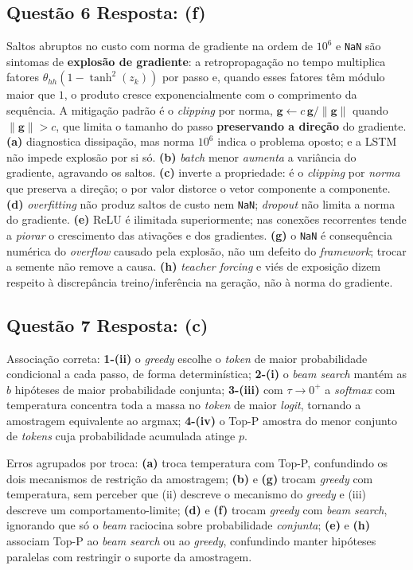 \documentclass[11pt,a4paper]{article}
\begin{document}
\subsection*{Questão 6 \textemdash{} Resposta: (f)}
Saltos abruptos no custo com norma de gradiente na ordem de $10^{6}$ e \texttt{NaN} são sintomas de \textbf{explosão de gradiente}: a retropropagação no tempo multiplica fatores $\theta_{hh}(1-\tanh^2(z_k))$ por passo e, quando esses fatores têm módulo maior que $1$, o produto cresce exponencialmente com o comprimento da sequência. A mitigação padrão é o \textit{clipping} por norma, $\mathbf{g} \leftarrow c\,\mathbf{g}/\|\mathbf{g}\|$ quando $\|\mathbf{g}\| > c$, que limita o tamanho do passo \textbf{preservando a direção} do gradiente.\\
\textbf{(a)} diagnostica dissipação, mas norma $10^{6}$ indica o problema oposto; e a LSTM não impede explosão por si só.
\textbf{(b)} \textit{batch} menor \emph{aumenta} a variância do gradiente, agravando os saltos.
\textbf{(c)} inverte a propriedade: é o \textit{clipping} por \emph{norma} que preserva a direção; o por valor distorce o vetor componente a componente.
\textbf{(d)} \textit{overfitting} não produz saltos de custo nem \texttt{NaN}; \textit{dropout} não limita a norma do gradiente.
\textbf{(e)} ReLU é ilimitada superiormente; nas conexões recorrentes tende a \emph{piorar} o crescimento das ativações e dos gradientes.
\textbf{(g)} o \texttt{NaN} é consequência numérica do \textit{overflow} causado pela explosão, não um defeito do \textit{framework}; trocar a semente não remove a causa.
\textbf{(h)} \textit{teacher forcing} e viés de exposição dizem respeito à discrepância treino/inferência na geração, não à norma do gradiente.

\subsection*{Questão 7 \textemdash{} Resposta: (c)}
Associação correta: \textbf{1-(ii)} o \textit{greedy} escolhe o \textit{token} de maior probabilidade condicional a cada passo, de forma determinística; \textbf{2-(i)} o \textit{beam search} mantém as $b$ hipóteses de maior probabilidade conjunta; \textbf{3-(iii)} com $\tau \to 0^{+}$ a \textit{softmax} com temperatura concentra toda a massa no \textit{token} de maior \textit{logit}, tornando a amostragem equivalente ao argmax; \textbf{4-(iv)} o Top-P amostra do menor conjunto de \textit{tokens} cuja probabilidade acumulada atinge $p$.

Erros agrupados por troca: \textbf{(a)} troca temperatura com Top-P, confundindo os dois mecanismos de restrição da amostragem; \textbf{(b)} e \textbf{(g)} trocam \textit{greedy} com temperatura, sem perceber que (ii) descreve o mecanismo do \textit{greedy} e (iii) descreve um comportamento-limite; \textbf{(d)} e \textbf{(f)} trocam \textit{greedy} com \textit{beam search}, ignorando que só o \textit{beam} raciocina sobre probabilidade \emph{conjunta}; \textbf{(e)} e \textbf{(h)} associam Top-P ao \textit{beam search} ou ao \textit{greedy}, confundindo manter hipóteses paralelas com restringir o suporte da amostragem.
\end{document}
